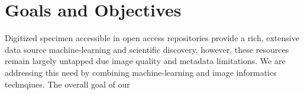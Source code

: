 \documentclass[conference]{IEEEtran}
\begin{document}

\section{Goals and Objectives}

Digitized specimen accessible in open access repositories provide a rich, extensive data source machine-learning and scientific discovery, however, these resources remain largely untapped due image quality and metadata limitations. We are addressing this need by combining machine-learning and image informatics technqiues. The overall goal of our  




\end{document}
